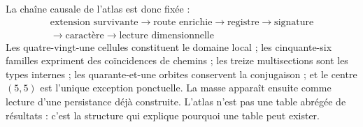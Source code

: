 La chaîne causale de l'atlas est donc fixée :
\[
 \boxed{
 \begin{gathered}
 \text{extension survivante}
 \longrightarrow\text{route enrichie}
 \longrightarrow\text{registre}
 \longrightarrow\text{signature}\\
 \longrightarrow\text{caractère}
 \longrightarrow\text{lecture dimensionnelle}
 \end{gathered}}
 \tag{A19}\label{eq:cadena-rectora-atlas-rev6}
\]
Les quatre-vingt-une cellules constituent le domaine local ; les cinquante-six
familles expriment des coïncidences de chemins ; les treize multisections sont les
types internes ; les quarante-et-une orbites conservent la conjugaison ; et le
centre \((5,5)\) est l'unique exception ponctuelle. La masse apparaît ensuite
comme lecture d'une persistance déjà construite. L'atlas n'est pas une table
abrégée de résultats : c'est la structure qui explique pourquoi une table peut
exister.
